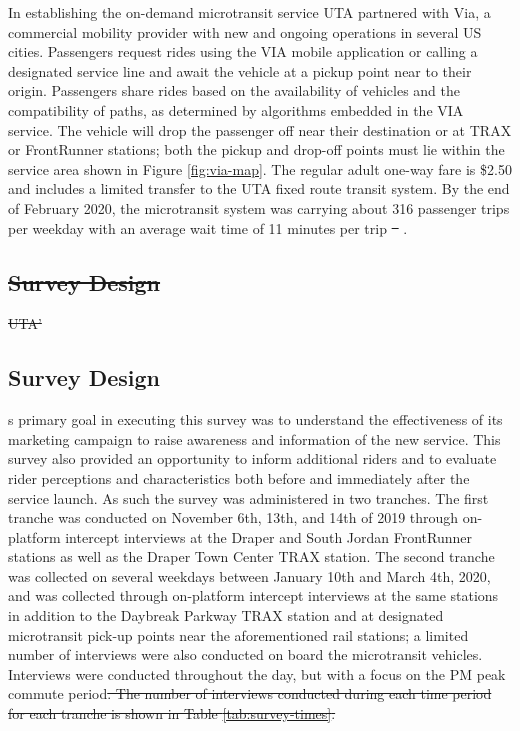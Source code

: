 \documentclass[smartcities,article,submit,moreauthors,pdftex]{mdpi} %
\providecommand{\DIFadd}[1]{{\protect\color{blue}\uwave{#1}}} %
\providecommand{\DIFdel}[1]{{\protect\color{red}\sout{#1}}}                      %
\providecommand{\DIFaddbegin}{} %
\providecommand{\DIFaddend}{} %
\providecommand{\DIFdelbegin}{} %
\providecommand{\DIFdelend}{} %
\begin{document}
In establishing the on-demand microtransit service UTA partnered with Via, a
commercial mobility provider with new and ongoing operations in several US
cities. Passengers request rides using the VIA mobile application or calling a
designated service line and await the vehicle at a pickup point near to their
origin. Passengers share rides based on the availability of vehicles and the
compatibility of paths, as determined by algorithms embedded in the VIA service.
The vehicle will drop the passenger off near their destination or at TRAX or
FrontRunner stations; both the pickup and drop-off points must lie within the
service area shown in Figure \ref{fig:via-map}. The regular adult one-way fare
is \$2.50 and includes a limited transfer to the UTA fixed route transit system.
By the end of February 2020, the microtransit system was carrying about 316
passenger trips per weekday with an average wait time of 11 minutes per trip
\DIFdelbegin \DIFdel{\mbox{%
\citep{uta2020}}\hspace{0pt}%
}\DIFdelend \DIFaddbegin \DIFadd{\mbox{%
\citet{uta2020}}\hspace{0pt}%
}\DIFaddend .

\DIFdelbegin \subsection{\DIFdel{Survey Design}}
\addtocounter{subsection}{-1}%
\DIFdel{UTA’}\DIFdelend \DIFaddbegin \hypertarget{survey-design}{%
\subsection{Survey Design}\label{survey-design}}

\DIFadd{UTA'}\DIFaddend s primary goal in executing this survey was to understand the effectiveness
of its marketing campaign to raise awareness and information of the new service.
This survey also provided an opportunity to inform additional riders and to
evaluate rider perceptions and characteristics both before and immediately after
the service launch. As such the survey was administered in two tranches. The
first tranche was conducted on November 6th, 13th, and 14th of 2019 through
on-platform intercept interviews at the Draper and South Jordan FrontRunner
stations as well as the Draper Town Center TRAX station. The second tranche was
collected on several weekdays between January 10th and March 4th, 2020, and was
collected through on-platform intercept interviews at the same stations in
addition to the Daybreak Parkway TRAX station and at designated microtransit
pick-up points near the aforementioned rail stations; a limited number of
interviews were also conducted on board the microtransit vehicles. Interviews
were conducted throughout the day, but with a focus on the PM peak commute
period\DIFdelbegin \DIFdel{. The number of interviews conducted during each time period for each tranche is shown in Table \ref{tab:survey-times}.
}%
\end{document}
